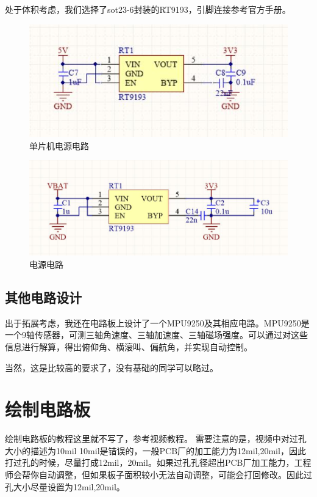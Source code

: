 \documentclass{article}
\begin{document}
处于体积考虑，我们选择了sot23-6封装的RT9193，引脚连接参考官方手册。
\begin{figure}[htb]
	\centering
	\includegraphics[scale=0.4]{电源电路.jpg}
	\caption{单片机电源电路}
	\label{fig:label}
\end{figure}
\begin{figure}[ht]
	\centering
	\includegraphics[scale=0.4]{rt9193.jpg}
	\caption{电源电路}
	\label{fig:label}
\end{figure}

\subsection{其他电路设计}
出于拓展考虑，我还在电路板上设计了一个MPU9250及其相应电路。MPU9250是一个9轴传感器，可测三轴角速度、三轴加速度、三轴磁场强度。可以通过对这些信息进行解算，得出俯仰角、横滚叫、偏航角，并实现自动控制。

当然，这是比较高的要求了，没有基础的同学可以略过。

\section{绘制电路板}
绘制电路板的教程这里就不写了，参考视频教程。
需要注意的是，视频中对过孔大小的描述为10mil 10mil是错误的，一般PCB厂的加工能力为12mil,20mil，因此打过孔的时候，尽量打成12mil，20mil。如果过孔孔径超出PCB厂加工能力，工程师会帮你自动调整，但如果板子面积较小无法自动调整，可能会打回修改。因此过孔大小尽量设置为12mil,20mil。
\end{document}
